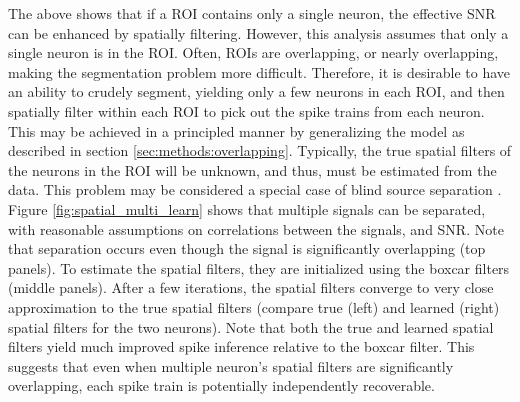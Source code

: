 The above shows that if a ROI contains only a single neuron, the effective SNR can be enhanced by spatially filtering.  However, this analysis assumes that only a single neuron is in the ROI.  Often, ROIs are overlapping, or nearly overlapping, making the segmentation problem more difficult.  Therefore, it is desirable to have an ability to crudely segment, yielding only a few neurons in each ROI, and then spatially filter within each ROI to pick out the spike trains from each neuron.  This may be achieved in a principled manner by generalizing the model as described in section \ref{sec:methods:overlapping}.  %
Typically, the true spatial filters of the neurons in the ROI will be unknown, and thus, must be estimated from the data.  This problem may be considered a special case of blind source separation \cite{BellSejnowski95, MukamelSchnitzer09}. Figure \ref{fig:spatial_multi_learn} shows that multiple signals can be separated, with reasonable assumptions on correlations between the signals, and SNR.  Note that separation occurs even though the signal is significantly overlapping (top panels). To estimate the spatial filters, they are initialized using the boxcar filters (middle panels).  After a few iterations, the spatial filters converge to very close approximation to the true spatial filters (compare true (left) and learned (right) spatial filters for the two neurons).  Note that both the true and learned spatial filters yield much improved spike inference relative to the boxcar filter.  This suggests that even when multiple neuron's spatial filters are significantly overlapping, each spike train is potentially independently recoverable.  




